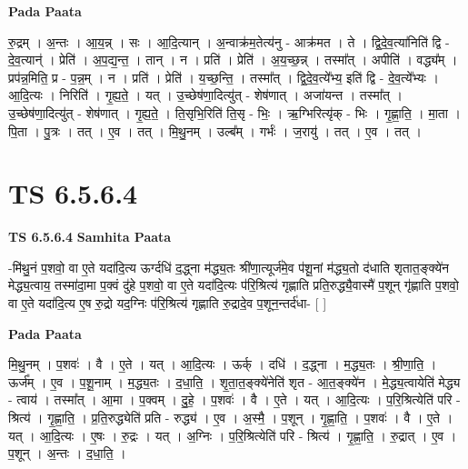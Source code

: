\documentclass[17pt]{extarticle}
\begin{document}
\textbf{Pada Paata} \newline

रु॒द्रम् । अ॒न्तः । आ॒य॒न्न् । सः । आ॒दि॒त्यान् । अ॒न्वाक्र॑म॒तेत्य॑नु - आक्र॑मत । ते । द्वि॒दे॒व॒त्या॑निति॑ द्वि - दे॒व॒त्यान्॑ । प्रेति॑ । अ॒प॒द्य॒न्त॒ । तान् । न । प्रति॑ । प्रेति॑ । अ॒य॒च्छ॒न्न् । तस्मा᳚त् । अपीति॑ । वद्ध्य᳚म् । प्रप॑न्न॒मिति॒ प्र - प॒न्न॒म् । न । प्रति॑ । प्रेति॑ । य॒च्छ॒न्ति॒ । तस्मा᳚त् । द्वि॒दे॒व॒त्ये᳚भ्य॒ इति॑ द्वि - दे॒व॒त्ये᳚भ्यः । आ॒दि॒त्यः । निरिति॑ । गृ॒ह्य॒ते॒ । यत् । उ॒च्छेष॑णा॒दित्यु॑त् - शेष॑णात् । अजा॑यन्त । तस्मा᳚त् । उ॒च्छेष॑णा॒दित्यु॑त् - शेष॑णात् । गृ॒ह्य॒ते॒ । ति॒सृभि॒रिति॑ ति॒सृ - भिः॒ । ऋ॒ग्भिरित्यृ॑क् - भिः । गृ॒ह्णा॒ति॒ । मा॒ता । पि॒ता । पु॒त्रः । तत् । ए॒व । तत् । मि॒थु॒नम् । उल्ब᳚म् । गर्भः॑ । ज॒रायु॑ । तत् । ए॒व । तत् ।  \newline




\section*{ TS 6.5.6.4 }

\textbf{TS 6.5.6.4 } \newline
\textbf{Samhita Paata} \newline

-मि॑थु॒नं प॒शवो॒ वा ए॒ते यदा॑दि॒त्य ऊर्ग्दधि॑ द॒द्ध्ना म॑द्ध्य॒तः श्री॑णा॒त्यूर्ज॑मे॒व प॑शू॒नां म॑द्ध्य॒तो द॑धाति शृतात॒ङ्क्ये॑न मेद्ध्य॒त्वाय॒ तस्मा॑दा॒मा प॒क्वं दु॑हे प॒शवो॒ वा ए॒ते यदा॑दि॒त्यः प॑रि॒श्रित्य॑ गृह्णाति प्रति॒रुद्ध्यै॒वास्मै॑ प॒शून् गृ॑ह्णाति प॒शवो॒ वा ए॒ते यदा॑दि॒त्य ए॒ष रु॒द्रो यद॒ग्निः प॑रि॒श्रित्य॑ गृह्णाति रु॒द्रादे॒व प॒शून॒न्तर्द॑धा- [  ] \newline

\textbf{Pada Paata} \newline

मि॒थु॒नम् । प॒शवः॑ । वै । ए॒ते । यत् । आ॒दि॒त्यः । ऊर्क् । दधि॑ । द॒द्ध्ना । म॒द्ध्य॒तः । श्री॒णा॒ति॒ । ऊर्ज᳚म् । ए॒व । प॒शू॒नाम् । म॒द्ध्य॒तः । द॒धा॒ति॒ । शृ॒ता॒त॒ङ्क्ये॑नेति॑ शृत - आ॒त॒ङ्क्ये॑न । मे॒द्ध्य॒त्वायेति॑ मेद्ध्य - त्वाय॑ । तस्मा᳚त् । आ॒मा । प॒क्वम् । दु॒हे॒ । प॒शवः॑ । वै । ए॒ते । यत् । आ॒दि॒त्यः । प॒रि॒श्रित्येति॑ परि - श्रित्य॑ । गृ॒ह्णा॒ति॒ । प्र॒ति॒रुद्ध्येति॑ प्रति - रुद्ध्य॑ । ए॒व । अ॒स्मै॒ । प॒शून् । गृ॒ह्णा॒ति॒ । प॒शवः॑ । वै । ए॒ते । यत् । आ॒दि॒त्यः । ए॒षः । रु॒द्रः । यत् । अ॒ग्निः । प॒रि॒श्रित्येति॑ परि - श्रित्य॑ । गृ॒ह्णा॒ति॒ । रु॒द्रात् । ए॒व । प॒शून् । अ॒न्तः । द॒धा॒ति॒ ।  \newline
\end{document}
